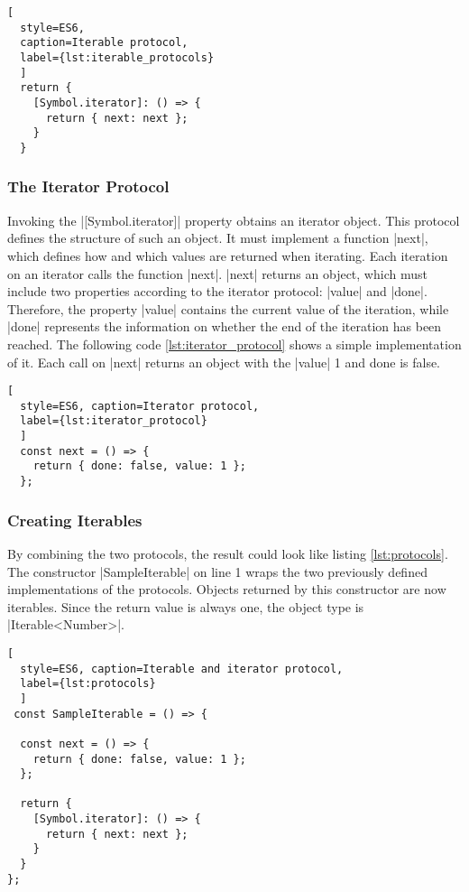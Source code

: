 \begin{lstlisting}[
  style=ES6, 
  caption=Iterable protocol,
  label={lst:iterable_protocols}
  ]
  return {
    [Symbol.iterator]: () => {
      return { next: next };
    }
  }
\end{lstlisting}

\subsubsection{The Iterator Protocol}
\label{subsub:The Iterator Protocol}
Invoking the |[Symbol.iterator]| property obtains an iterator object.
This protocol defines the structure of such an object. It must 
implement a function |next|, which defines how and which values are returned 
when iterating.
Each iteration on an iterator calls the function |next|. |next| returns an object, which must
include two properties according to the iterator protocol: |value| and |done|.
Therefore, the property |value| contains the current value of the iteration,
while |done| represents the information on whether the end of the iteration has 
been reached. The following code \ref{lst:iterator_protocol} shows a simple 
implementation of it. Each call on |next| returns an object with the |value| 
1 and done is false. 

\begin{lstlisting}[
  style=ES6, caption=Iterator protocol,
  label={lst:iterator_protocol}
  ]
  const next = () => {
    return { done: false, value: 1 };
  };
\end{lstlisting}

\subsubsection{Creating Iterables}
\label{subsub:Creating Iterables}
By combining the two protocols, the result could look like listing
\ref{lst:protocols}. The constructor |SampleIterable| on line 1 wraps the two previously
defined implementations of the protocols. Objects returned by this constructor 
are now iterables. Since the return value is always one, the object type
is |Iterable<Number>|.

\begin{lstlisting}[
  style=ES6, caption=Iterable and iterator protocol,
  label={lst:protocols}
  ]
 const SampleIterable = () => {

  const next = () => {
    return { done: false, value: 1 };
  };

  return {
    [Symbol.iterator]: () => {
      return { next: next };
    }
  }
};
\end{lstlisting}

